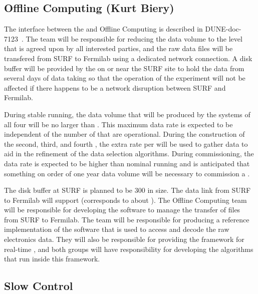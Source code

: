 \subsection{Offline Computing (Kurt Biery)}
\label{sec:fd-daq-intfc-fnal-cmptg}

The interface between the  and Offline Computing is
described in DUNE-doc-7123~\cite{docdb7123}.
The  team will be responsible for reducing the data volume
to the level that is agreed upon by all interested parties, and the
raw data files will be transfered from SURF to Fermilab using a
dedicated network connection.
A disk buffer will be provided by the  on or near the SURF
site to hold the data from several days of data taking so that the
operation of the experiment will not be affected if there happens to
be a network disruption between SURF and Fermilab.

During stable running, the data volume that will be produced by the
 systems of all four  will be no larger
than \offsitepbpy.
This maximum data rate is expected to be independent of the number of
 that are operational.
During the construction of the second, third, and fourth
, the extra rate per  will be used
to gather data to aid in the refinement of the data selection
algorithms.
During commissioning, the data rate is expected to be higher than
nominal running and is anticipated that something on order of one year
data volume will be necessary to commission a .

The disk buffer at SURF is planned to be \SI{300}{\TB} in size.
The data link from SURF to Fermilab will support \surffnalbw
(\offsitepbpy corresponds to about \offsitegbps).
The Offline Computing team will be responsible for developing the
software to manage the transfer of files from SURF to Fermilab.
The  team will be responsible for producing a reference
implementation of the software that is used to access and decode the
raw electronics data.
They will also be responsible for providing the framework for
real-time , and both groups will have responsibility for
developing the  algorithms that run inside this framework.

\subsection{Slow Control}
\label{sec:fd-daq-intfc-sc}
\label{sec:fd-daq-intfc-sc}


